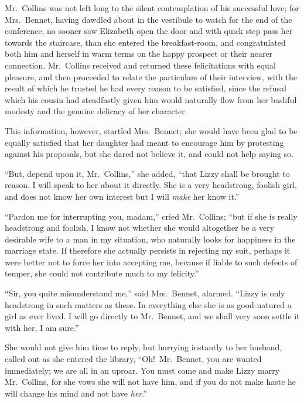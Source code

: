 \documentclass[12pt,english]{book}
\begin{document}


Mr.\ Collins was not left long to the silent contemplation of his
successful love; for Mrs.\ Bennet, having dawdled about in the vestibule
to watch for the end of the conference, no sooner saw Elizabeth open
the door and with quick step pass her towards the staircase, than
she entered the breakfast-room, and congratulated both him and herself
in warm terms on the happy prospect or their nearer connection. Mr.\ Collins
received and returned these felicitations with equal pleasure, and
then proceeded to relate the particulars of their interview, with
the result of which he trusted he had every reason to be satisfied,
since the refusal which his cousin had steadfastly given him would
naturally flow from her bashful modesty and the genuine delicacy of
her character.

This information, however, startled Mrs.\ Bennet; she would have
been glad to be equally satisfied that her daughter had meant to encourage
him by protesting against his proposals, but she dared not believe
it, and could not help saying so.

{}``But, depend upon it, Mr.\ Collins,'' she added, {}``that Lizzy
shall be brought to reason. I will speak to her about it directly.
She is a very headstrong, foolish girl, and does not know her own
interest but I will \textit{make} her know it.''

{}``Pardon me for interrupting you, madam,'' cried Mr.\ Collins;
{}``but if she is really headstrong and foolish, I know not whether
she would altogether be a very desirable wife to a man in my situation,
who naturally looks for happiness in the marriage state. If therefore
she actually persists in rejecting my suit, perhaps it were better
not to force her into accepting me, because if liable to such defects
of temper, she could not contribute much to my felicity.''

{}``Sir, you quite misunderstand me,'' said Mrs.\ Bennet, alarmed.
{}``Lizzy is only headstrong in such matters as these. In everything
else she is as good-natured a girl as ever lived. I will go directly
to Mr.\ Bennet, and we shall very soon settle it with her, I am sure.''

She would not give him time to reply, but hurrying instantly to her
husband, called out as she entered the library, {}``Oh!\ Mr.\ Bennet,
you are wanted immediately; we are all in an uproar. You must come
and make Lizzy marry Mr.\ Collins, for she vows she will not have
him, and if you do not make haste he will change his mind and not
have \textit{her}.''
\end{document}
